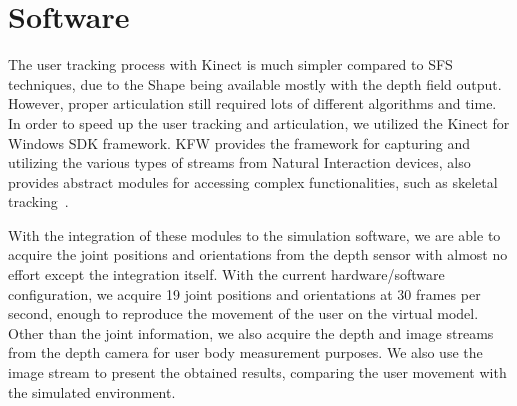 \section{Software}

The user tracking process with Kinect is much simpler compared to SFS techniques, due to the Shape being available mostly with the depth field output. However, proper articulation still required lots of different algorithms and time. In order to speed up the user tracking and articulation, we utilized the Kinect for Windows SDK framework. KFW provides the framework for capturing and utilizing the various types of streams from Natural Interaction devices, also provides abstract modules for accessing complex functionalities, such as skeletal tracking~\cite{OpenNI2102}. 

With the integration of these modules to the simulation software, we are able to acquire the joint positions and orientations from the depth sensor with almost no effort except the integration itself. With the current hardware/software configuration, we acquire 19 joint positions and orientations at 30 frames per second, enough to reproduce the movement of the user on the virtual model. Other than the joint information, we also acquire the depth and image streams from the depth camera for user body measurement purposes. We also use the image stream to present the obtained results, comparing the user movement with the simulated environment.